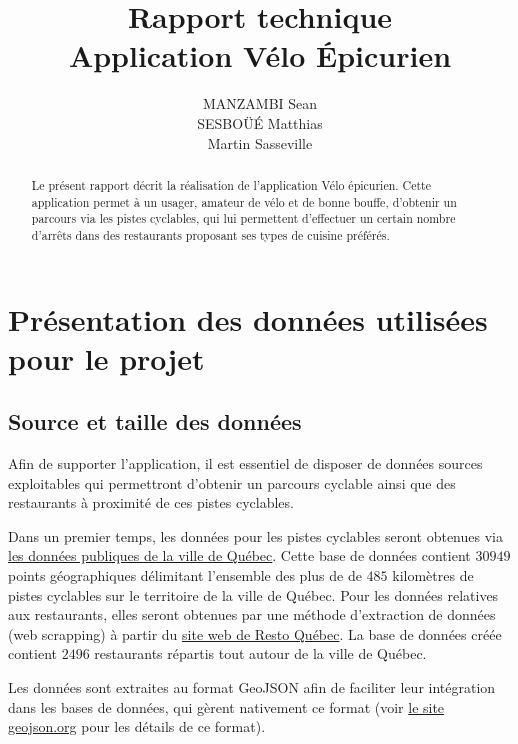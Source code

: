 \documentclass[12pt]{article}
\begin{document}
\title{Rapport technique \\ Application Vélo Épicurien}
\author{MANZAMBI Sean \\ SESBOÜÉ Matthias \\ Martin Sasseville}

\maketitle

\begin{abstract}
    Le présent rapport décrit la réalisation de l'application Vélo épicurien. Cette application permet à un usager, amateur de vélo et de bonne bouffe, d'obtenir un parcours via les pistes cyclables, qui lui permettent d'effectuer un certain nombre d'arrêts dans des restaurants proposant ses types de cuisine préférés.
\end{abstract}

\section{Présentation des données utilisées pour le projet}

\subsection{Source et taille des données}

    Afin de supporter l'application, il est essentiel de disposer de données sources exploitables qui permettront d'obtenir un parcours cyclable ainsi que des restaurants à proximité de ces pistes cyclables. 
    
    Dans un premier temps, les données pour les pistes cyclables seront obtenues via \href{https://www.donneesquebec.ca/recherche/fr/dataset/vque_24}{les données publiques de la ville de Québec}. Cette base de données contient $30949$ points géographiques délimitant l'ensemble des plus de de $485$ kilomètres de pistes cyclables sur le territoire de la ville de Québec. Pour les données relatives aux restaurants, elles seront obtenues par une méthode d'extraction de données (web scrapping) à partir du \href{https://www.restoquebec.ca/}{site web de Resto Québec}. La base de données créée contient $2496$ restaurants répartis tout autour de la ville de Québec.

    Les données sont extraites au format GeoJSON afin de faciliter leur intégration dans les bases de données, qui gèrent nativement ce format (voir \href{https://geojson.org/}{le site geojson.org} pour les détails de ce format).
\end{document}
